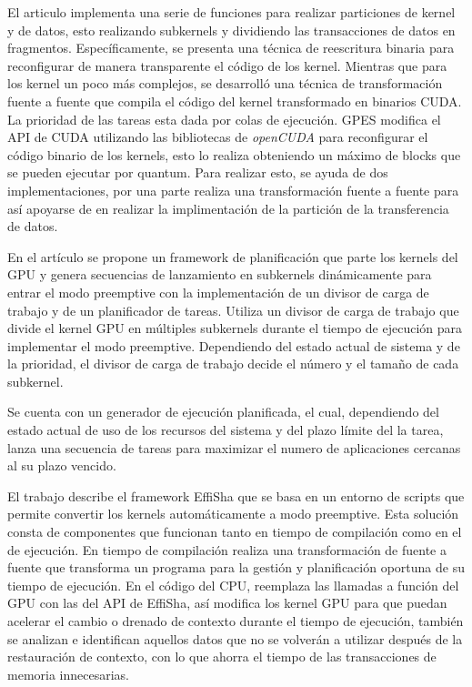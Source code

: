 
El articulo \cite{GPES} implementa una serie de funciones para realizar particiones de kernel y de datos, esto realizando subkernels y dividiendo las transacciones de datos en fragmentos. 
Específicamente, se presenta una técnica de reescritura binaria para reconfigurar de manera transparente el código de los kernel. Mientras que para los kernel un poco más complejos, se desarrolló una técnica de transformación fuente a fuente que compila el código del kernel transformado en binarios CUDA. La prioridad de las tareas esta dada por colas de ejecución. GPES modifica el API de CUDA utilizando las bibliotecas de  \textit{openCUDA} para reconfigurar el código binario de los kernels, esto lo realiza obteniendo un máximo de blocks que se pueden ejecutar por quantum. Para realizar esto, se ayuda de dos implementaciones, por una parte realiza una transformación fuente a fuente para así apoyarse de en realizar la implimentación de la partición de la transferencia de datos.


En el artículo \cite{RTFG} se propone un framework de planificación que parte los kernels del GPU y genera secuencias de lanzamiento en subkernels dinámicamente para entrar el modo preemptive con la implementación de un divisor de carga de trabajo y de un planificador de tareas. Utiliza un divisor de carga de trabajo que divide el kernel GPU en múltiples subkernels durante el tiempo de ejecución para implementar el modo preemptive. Dependiendo del estado actual de sistema y de la prioridad, el divisor de carga de trabajo decide el número y el tamaño de cada subkernel. 

\vspace{0.3cm}

Se cuenta con un generador de ejecución planificada, el cual, dependiendo del estado actual de uso de los recursos del sistema y del plazo límite del la tarea, lanza una secuencia de tareas para maximizar el numero de aplicaciones cercanas al su plazo vencido.	

El trabajo \cite{Effisha} describe el framework EffiSha que se basa en un entorno de scripts que permite convertir los kernels automáticamente a modo preemptive. Esta solución consta de componentes que funcionan tanto en tiempo de compilación como en el de ejecución. En tiempo de compilación realiza una transformación de fuente a fuente que transforma un programa para la gestión y planificación oportuna de su tiempo de ejecución.
En el código del CPU, reemplaza las llamadas a función del GPU con las del API de EffiSha, así modifica los kernel GPU para que puedan acelerar el cambio o drenado de contexto durante el tiempo de ejecución, también se analizan e identifican aquellos datos que no se volverán a utilizar después de la restauración de contexto, con lo que ahorra el tiempo de las transacciones de memoria innecesarias.

